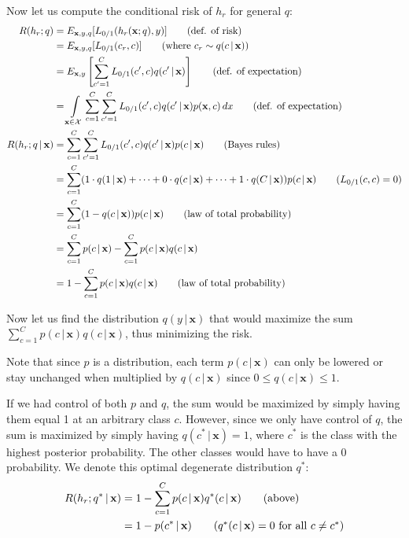 \documentclass{article}
\renewcommand{\vec}[1]{\mathbf{#1}}
\begin{document}
Now let us compute the conditional risk of $h_r$ for general $q$:
\begin{align*}
  R(h_r;q)&=E_{\vec x,y,q}[L_{0/1}(h_r(\vec x;q),y)]\tag{def. of risk}\\
  &=E_{\vec x,y,q}[L_{0/1}(c_r,c)]\tag{where $c_r\sim q(c\,|\,\vec x)$}\\
  &=E_{\vec x,y}\left[\sum_{c'=1}^CL_{0/1}(c',c)q(c'\,|\,\vec x)\right]\tag{def. of expectation}\\
  &=\int\displaylimits_{\vec x\in\mathcal X}\sum_{c=1}^C\sum_{c'=1}^CL_{0/1}(c',c)q(c'\,|\,\vec x)p(\vec x, c)\,dx\tag{def. of expectation}\\
  R(h_r;q\,|\,\vec x)&=\sum_{c=1}^C\sum_{c'=1}^CL_{0/1}(c',c)q(c'\,|\,\vec x)p(c\,|\,\vec x)\tag{Bayes rules}\\
  &=\sum_{c=1}^C(1\cdot q(1\,|\,\vec x)+\cdots+0\cdot q(c\,|\,\vec x)+\cdots+1\cdot q(C\,|\,\vec x))p(c\,|\,\vec x)\tag{$L_{0/1}(c,c)=0$}\\
  &=\sum_{c=1}^C(1-q(c\,|\,\vec x))p(c\,|\,\vec x)\tag{law of total probability}\\
  &=\sum_{c=1}^Cp(c\,|\,\vec x)-\sum_{c=1}^Cp(c\,|\,\vec x)q(c\,|\,\vec x)\\
  &=1-\sum_{c=1}^Cp(c\,|\,\vec x)q(c\,|\,\vec x)\tag{law of total probability}\\
\end{align*}

Now let us find the distribution $q(y\,|\,\vec x)$ that would maximize the sum $\sum_{c=1}^Cp(c\,|\,\vec x)q(c\,|\,\vec x)$, thus minimizing the risk.

Note that since $p$ is a distribution, each term $p(c\,|\,\vec x)$ can only be lowered or stay unchanged when multiplied by $q(c\,|\,\vec x)$ since $0\le q(c\,|\,\vec x)\le 1$.

If we had control of both $p$ and $q$, the sum would be maximized by simply having them equal 1 at an arbitrary class $c$. However, since we only have control of $q$, the sum is maximized by simply having $q(c^*\,|\,\vec x)=1$, where $c^*$ is the class with the highest posterior probability. The other classes would have to have a 0 probability. We denote this optimal degenerate distribution $q^*$:
\begin{align*}
  R(h_r;q^*\,|\,\vec x)&=1-\sum_{c=1}^Cp(c\,|\,\vec x)q^*(c\,|\,\vec x)\tag{above}\\
  &=1-p(c^*\,|\,\vec x)\tag{$q^*(c\,|\,\vec x)=0$ for all $c\not=c^*$}
\end{align*}
\end{document}
